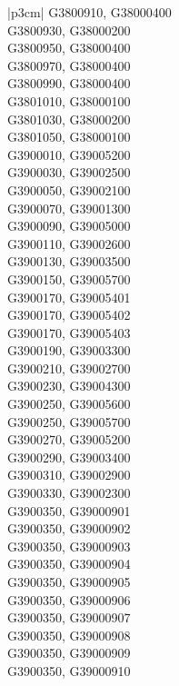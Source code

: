 \begin{customLongTable}{ |p{3cm}| }
G3800910, G38000400 \\ \hline
G3800930, G38000200 \\ \hline
G3800950, G38000400 \\ \hline
G3800970, G38000400 \\ \hline
G3800990, G38000400 \\ \hline
G3801010, G38000100 \\ \hline
G3801030, G38000200 \\ \hline
G3801050, G38000100 \\ \hline
G3900010, G39005200 \\ \hline
G3900030, G39002500 \\ \hline
G3900050, G39002100 \\ \hline
G3900070, G39001300 \\ \hline
G3900090, G39005000 \\ \hline
G3900110, G39002600 \\ \hline
G3900130, G39003500 \\ \hline
G3900150, G39005700 \\ \hline
G3900170, G39005401 \\ \hline
G3900170, G39005402 \\ \hline
G3900170, G39005403 \\ \hline
G3900190, G39003300 \\ \hline
G3900210, G39002700 \\ \hline
G3900230, G39004300 \\ \hline
G3900250, G39005600 \\ \hline
G3900250, G39005700 \\ \hline
G3900270, G39005200 \\ \hline
G3900290, G39003400 \\ \hline
G3900310, G39002900 \\ \hline
G3900330, G39002300 \\ \hline
G3900350, G39000901 \\ \hline
G3900350, G39000902 \\ \hline
G3900350, G39000903 \\ \hline
G3900350, G39000904 \\ \hline
G3900350, G39000905 \\ \hline
G3900350, G39000906 \\ \hline
G3900350, G39000907 \\ \hline
G3900350, G39000908 \\ \hline
G3900350, G39000909 \\ \hline
G3900350, G39000910 \\ \hline

\end{customLongTable}
